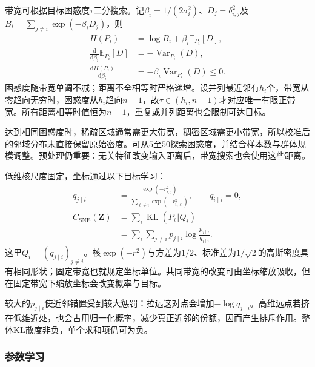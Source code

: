 带宽可根据目标困惑度$\tau$二分搜索。记$\beta_i=1/(2\sigma_i^2)$、$D_j=\delta_{i,j}^2$及$B_i=\sum_{j\ne i}\exp(-\beta_iD_j)$，则
\begin{equation}
  \label{eq:dim-sne-entropy-monotonicity}
  \begin{aligned}
    H(P_i)&=\log B_i+\beta_i\mathbb{E}_{P_i}[D],\\
    \frac{\mathrm{d}}{\mathrm{d}\beta_i}\mathbb{E}_{P_i}[D]
      &=-\operatorname{Var}_{P_i}(D),\\
    \frac{\mathrm{d}H(P_i)}{\mathrm{d}\beta_i}
      &=-\beta_i\operatorname{Var}_{P_i}(D)\leq 0.
  \end{aligned}
\end{equation}
困惑度随带宽单调不减；距离不全相等时严格递增。设并列最近邻有$h_i$个，带宽从零趋向无穷时，困惑度从$h_i$趋向$n-1$，故$\tau\in(h_i,n-1)$才对应唯一有限正带宽。所有距离相等时值恒为$n-1$，重复或并列距离也会限制可达目标。

达到相同困惑度时，稀疏区域通常需更大带宽，稠密区域需更小带宽，所以校准后的邻域分布未直接保留原始密度。可从$5$至$50$探索困惑度，并结合样本数与群体规模调整。预处理仍重要：无关特征改变输入距离后，带宽搜索也会使用这些距离。

低维核尺度固定，坐标通过以下目标学习：
\begin{equation}
  \label{eq:dim-sne-low-loss}
  \begin{aligned}
    q_{j\mid i}
      &=\frac{\exp(-r_{i,j}^2)}
      {\sum_{\ell\ne i}\exp(-r_{i,\ell}^2)},\qquad q_{i\mid i}=0,\\
    C_{\mathrm{SNE}}(\bm{Z})
      &=\sum_i\operatorname{KL}(P_i\Vert Q_i)\\
      &=\sum_i\sum_{j\ne i}p_{j\mid i}
        \log\frac{p_{j\mid i}}{q_{j\mid i}}.
  \end{aligned}
\end{equation}
这里$Q_i=(q_{j\mid i})_{j\ne i}$。核$\exp(-r^2)$与方差为$1/2$、标准差为$1/\sqrt{2}$的高斯密度具有相同形状；固定带宽也就规定坐标单位。共同带宽的改变可由坐标缩放吸收，但在固定带宽下缩放坐标会改变概率与目标。

较大的$p_{j\mid i}$使近邻错置受到较大惩罚：拉远这对点会增加$-\log q_{j\mid i}$。高维远点若挤在低维近处，也会占用归一化概率，减少真正近邻的份额，因而产生排斥作用。整体KL散度非负，单个求和项仍可为负。

\subsubsection{参数学习}

